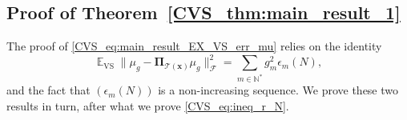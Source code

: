 \documentclass[twoside,11pt]{book}
\numberwithin{theorem}{chapter}
\numberwithin{definition}{chapter}
\numberwithin{proposition}{chapter}
\numberwithin{corollary}{chapter}
\numberwithin{example}{chapter}
\numberwithin{lemma}{chapter}
\numberwithin{assumption}{chapter}
\numberwithin{equation}{chapter}
\numberwithin{figure}{chapter}
\DeclareMathOperator{\VS}{\mathrm{VS}}
\DeclareMathOperator{\Tran}{\intercal}
\DeclareMathOperator{\EX}{\mathbb{E}}
\DeclareMathOperator{\F}{\mathcal{F}}
\DeclareMathOperator{\Ns}{\mathbb{N}^{*}}
\begin{document}

\subsection{Proof of Theorem~\ref{CVS_thm:main_result_1}}\label{CVS_app:proof_main_result_1}
The proof of \eqref{CVS_eq:main_result_EX_VS_err_mu} relies on the identity
\begin{equation}\label{CVS_eq:main_result_EX_VS_err_mu_2}
\EX_{\VS} \|\mu_{g} - \bm{\Pi}_{\mathcal{T}(\bm{x})} \mu_{g}\|_{\F}^{2} = \sum\limits_{m \in \mathbb{N}^{*}} g_{m}^{2} \epsilon_{m}(N),
\end{equation}
and the fact that $(\epsilon_{m}(N))$ is a non-increasing sequence. We prove these two results in turn, after what we prove \eqref{CVS_eq:ineq_r_N}.
\end{document}
